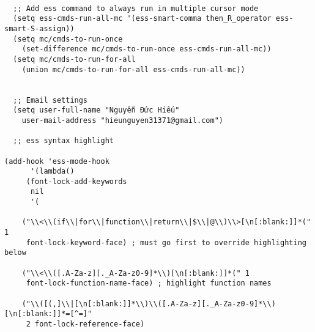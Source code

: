\documentclass[11pt]{article}
\begin{document}
\begin{verbatim}

  ;; Add ess command to always run in multiple cursor mode
  (setq ess-cmds-run-all-mc '(ess-smart-comma then_R_operator ess-smart-S-assign))
  (setq mc/cmds-to-run-once 
    (set-difference mc/cmds-to-run-once ess-cmds-run-all-mc))
  (setq mc/cmds-to-run-for-all 
    (union mc/cmds-to-run-for-all ess-cmds-run-all-mc))


  ;; Email settings
  (setq user-full-name "Nguyễn Đức Hiếu"
	user-mail-address "hieunguyen31371@gmail.com")

  ;; ess syntax highlight

(add-hook 'ess-mode-hook
      '(lambda()
	 (font-lock-add-keywords
	  nil
	  '(

	("\\<\\(if\\|for\\|function\\|return\\|$\\|@\\)\\>[\n[:blank:]]*(" 1
	 font-lock-keyword-face) ; must go first to override highlighting below

	("\\<\\([.A-Za-z][._A-Za-z0-9]*\\)[\n[:blank:]]*(" 1
	 font-lock-function-name-face) ; highlight function names

	("\\([(,]\\|[\n[:blank:]]*\\)\\([.A-Za-z][._A-Za-z0-9]*\\)[\n[:blank:]]*=[^=]"
	 2 font-lock-reference-face)


\end{verbatim}
\end{document}
